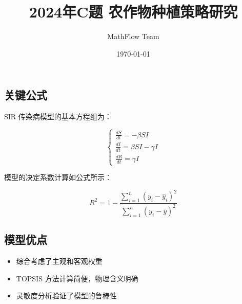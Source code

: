 \subsection{关键公式}


SIR 传染病模型的基本方程组为：


\begin{equation}
\begin{cases}
  \frac{dS}{dt} = -\beta S I \\
  \frac{dI}{dt} = \beta S I - \gamma I \\
  \frac{dR}{dt} = \gamma I
\end{cases}
  \label{eq:sir}
\end{equation}


模型的决定系数计算如公式所示：


\begin{equation}
  R^2 = 1 - \frac{\sum_{i=1}^{n}(y_i - \hat{y}_i)^2}{\sum_{i=1}^{n}(y_i - \bar{y})^2}
  \label{eq:r2}
\end{equation}


\subsection{模型优点}


\begin{itemize}
  \item 综合考虑了主观和客观权重
  \item TOPSIS 方法计算简便，物理含义明确
  \item 灵敏度分析验证了模型的鲁棒性
\end{itemize}

\documentclass[12pt,a4paper]{article}
\usepackage[UTF8]{ctex}
\usepackage{amsmath,amssymb,amsfonts}
\usepackage{graphicx}
\usepackage{booktabs}
\usepackage{hyperref}
\usepackage{float}
\usepackage{geometry}
\usepackage{caption}
\usepackage{subcaption}
\usepackage{enumitem}
\usepackage{listings}
\usepackage{xcolor}
\geometry{left=2.5cm,right=2.5cm,top=2.5cm,bottom=2.5cm}

\title{2024年C题 农作物种植策略研究}
\author{MathFlow Team}
\date{\today}


\maketitle
\tableofcontents
\newpage



